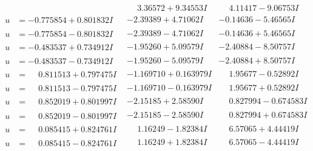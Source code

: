 \documentclass[1p]{elsarticle_modified}
\theoremstyle{definition}
\begin{document}
$$\begin{array}{c|c|c}
 & \phantom{-}3.36572 + 9.34553 I & \phantom{-}4.11417 - 9.06753 I \\ \hline\begin{aligned}
u &= -0.775854 + 0.801832 I\end{aligned}
 & -2.39389 + 4.71062 I & -0.14636 - 5.46565 I \\ \hline\begin{aligned}
u &= -0.775854 - 0.801832 I\end{aligned}
 & -2.39389 - 4.71062 I & -0.14636 + 5.46565 I \\ \hline\begin{aligned}
u &= -0.483537 + 0.734912 I\end{aligned}
 & -1.95260 + 5.09579 I & -2.40884 - 8.50757 I \\ \hline\begin{aligned}
u &= -0.483537 - 0.734912 I\end{aligned}
 & -1.95260 - 5.09579 I & -2.40884 + 8.50757 I \\ \hline\begin{aligned}
u &= \phantom{-}0.811513 + 0.797475 I\end{aligned}
 & -1.169710 + 0.163979 I & \phantom{-}1.95677 - 0.52892 I \\ \hline\begin{aligned}
u &= \phantom{-}0.811513 - 0.797475 I\end{aligned}
 & -1.169710 - 0.163979 I & \phantom{-}1.95677 + 0.52892 I \\ \hline\begin{aligned}
u &= \phantom{-}0.852019 + 0.801997 I\end{aligned}
 & -2.15185 + 2.58590 I & \phantom{-}0.827994 - 0.674583 I \\ \hline\begin{aligned}
u &= \phantom{-}0.852019 - 0.801997 I\end{aligned}
 & -2.15185 - 2.58590 I & \phantom{-}0.827994 + 0.674583 I \\ \hline\begin{aligned}
u &= \phantom{-}0.085415 + 0.824761 I\end{aligned}
 & \phantom{-}1.16249 - 1.82384 I & \phantom{-}6.57065 + 4.44419 I \\ \hline\begin{aligned}
u &= \phantom{-}0.085415 - 0.824761 I\end{aligned}
 & \phantom{-}1.16249 + 1.82384 I & \phantom{-}6.57065 - 4.44419 I \\ \hline\begin{aligned}

\end{aligned}
\end{array}$$
\end{document}
